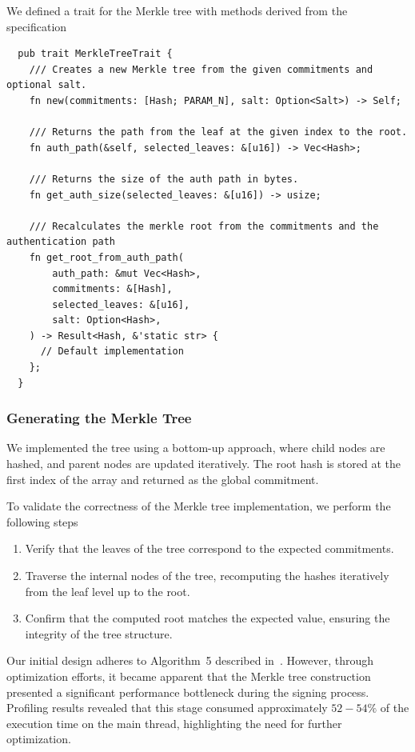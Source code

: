 \documentclass[11pt]{report}
\theoremstyle{definition}
\theoremstyle{plain}
\begin{document}
We defined a trait for the Merkle tree with methods derived from the specification
\begin{verbatim}
  pub trait MerkleTreeTrait {
    /// Creates a new Merkle tree from the given commitments and optional salt.
    fn new(commitments: [Hash; PARAM_N], salt: Option<Salt>) -> Self;

    /// Returns the path from the leaf at the given index to the root.
    fn auth_path(&self, selected_leaves: &[u16]) -> Vec<Hash>;

    /// Returns the size of the auth path in bytes.
    fn get_auth_size(selected_leaves: &[u16]) -> usize;

    /// Recalculates the merkle root from the commitments and the authentication path
    fn get_root_from_auth_path(
        auth_path: &mut Vec<Hash>,
        commitments: &[Hash],
        selected_leaves: &[u16],
        salt: Option<Hash>,
    ) -> Result<Hash, &'static str> {
      // Default implementation
    };
  }
\end{verbatim}

\subsubsection{Generating the Merkle Tree}\label{sec:new}

We implemented the tree using a bottom-up approach, where child nodes are hashed, and parent nodes are updated iteratively. The root hash is stored at the first index of the array and returned as the global commitment.

To validate the correctness of the Merkle tree implementation, we perform the following steps

\begin{enumerate}[parsep=0pt, itemsep=0pt]
  \item Verify that the leaves of the tree correspond to the expected commitments.
  \item Traverse the internal nodes of the tree, recomputing the hashes iteratively from the leaf level up to the root.
  \item Confirm that the computed root matches the expected value, ensuring the integrity of the tree structure.
\end{enumerate}

Our initial design adheres to Algorithm~5 described in~\cite[p31]{aguilarsyndrome11}. However, through optimization efforts, it became apparent that the Merkle tree construction presented a significant performance bottleneck during the signing process. Profiling results revealed that this stage consumed approximately $52-54\%$ of the execution time on the main thread, highlighting the need for further optimization.
\end{document}

